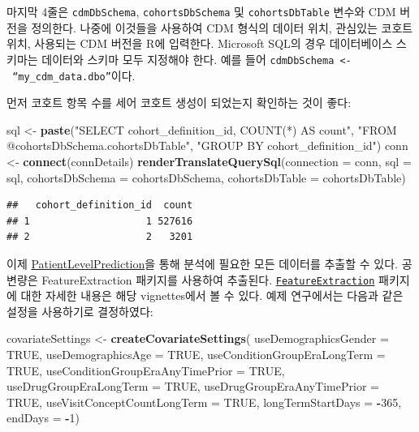 \documentclass[11pt]{book}
\newenvironment{Shaded}{\begin{snugshade}}{\end{snugshade}}
\newcommand{\KeywordTok}[1]{\textcolor[rgb]{0.13,0.29,0.53}{\textbf{#1}}}
\newcommand{\DataTypeTok}[1]{\textcolor[rgb]{0.13,0.29,0.53}{#1}}
\newcommand{\DecValTok}[1]{\textcolor[rgb]{0.00,0.00,0.81}{#1}}
\newcommand{\StringTok}[1]{\textcolor[rgb]{0.31,0.60,0.02}{#1}}
\newcommand{\OtherTok}[1]{\textcolor[rgb]{0.56,0.35,0.01}{#1}}
\newcommand{\OperatorTok}[1]{\textcolor[rgb]{0.81,0.36,0.00}{\textbf{#1}}}
\newcommand{\NormalTok}[1]{#1}
\theoremstyle{definition}
\theoremstyle{definition}
\theoremstyle{definition}
\theoremstyle{remark}
\begin{document}
마지막 4줄은 \texttt{cdmDbSchema}, \texttt{cohortsDbSchema} 및
\texttt{cohortsDbTable} 변수와 CDM 버전을 정의한다. 나중에 이것들을
사용하여 CDM 형식의 데이터 위치, 관심있는 코호트 위치, 사용되는 CDM
버전을 R에 입력한다. Microsoft SQL의 경우 데이터베이스 스키마는 데이터와
스키마 모두 지정해야 한다. 예를 들어
\texttt{cdmDbSchema\ \textless{}-\ “my\_cdm\_data.dbo”}이다.

먼저 코호트 항목 수를 세어 코호트 생성이 되었는지 확인하는 것이 좋다:

\begin{Shaded}
\begin{Highlighting}[]
\NormalTok{sql <-}\StringTok{ }\KeywordTok{paste}\NormalTok{(}\StringTok{"SELECT cohort_definition_id, COUNT(*) AS count"}\NormalTok{,}
\StringTok{"FROM @cohortsDbSchema.cohortsDbTable"}\NormalTok{,}
\StringTok{"GROUP BY cohort_definition_id"}\NormalTok{)}
\NormalTok{conn <-}\StringTok{ }\KeywordTok{connect}\NormalTok{(connDetails)}
\KeywordTok{renderTranslateQuerySql}\NormalTok{(}\DataTypeTok{connection =}\NormalTok{ conn, }
                        \DataTypeTok{sql =}\NormalTok{ sql,}
                        \DataTypeTok{cohortsDbSchema =}\NormalTok{ cohortsDbSchema,}
                        \DataTypeTok{cohortsDbTable =}\NormalTok{ cohortsDbTable)}
\end{Highlighting}
\end{Shaded}

\begin{verbatim}
##   cohort_definition_id  count
## 1                    1 527616
## 2                    2   3201
\end{verbatim}

이제
\href{https://ohdsi.github.io/PatientLevelPrediction/}{PatientLevelPrediction}을
통해 분석에 필요한 모든 데이터를 추출할 수 있다. 공변량은
FeatureExtraction 패키지를 사용하여 추출된다.
\href{https://ohdsi.github.io/FeatureExtraction/}{\texttt{FeatureExtraction}}
패키지에 대한 자세한 내용은 해당 vignettes에서 볼 수 있다. 예제
연구에서는 다음과 같은 설정을 사용하기로 결정하였다:

\begin{Shaded}
\begin{Highlighting}[]
\NormalTok{covariateSettings <-}\StringTok{ }\KeywordTok{createCovariateSettings}\NormalTok{(}
\DataTypeTok{useDemographicsGender =} \OtherTok{TRUE}\NormalTok{,}
                          \DataTypeTok{useDemographicsAge =} \OtherTok{TRUE}\NormalTok{,}
                          \DataTypeTok{useConditionGroupEraLongTerm =} \OtherTok{TRUE}\NormalTok{,}
                          \DataTypeTok{useConditionGroupEraAnyTimePrior =} \OtherTok{TRUE}\NormalTok{,}
                          \DataTypeTok{useDrugGroupEraLongTerm =} \OtherTok{TRUE}\NormalTok{,}
                          \DataTypeTok{useDrugGroupEraAnyTimePrior =} \OtherTok{TRUE}\NormalTok{,}
                          \DataTypeTok{useVisitConceptCountLongTerm =} \OtherTok{TRUE}\NormalTok{,}
                          \DataTypeTok{longTermStartDays =} \OperatorTok{-}\DecValTok{365}\NormalTok{,}
                          \DataTypeTok{endDays =} \OperatorTok{-}\DecValTok{1}\NormalTok{)}
\end{Highlighting}
\end{Shaded}
\end{document}
